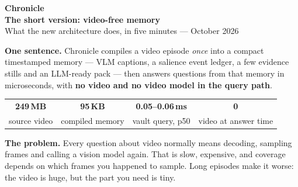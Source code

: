 \documentclass[10pt,a4paper]{article}
\newcommand{\panel}[1]{%
  \noindent\colorbox{panel}{%
    \begin{minipage}{\dimexpr\linewidth-2\fboxsep\relax}
    \vspace{2pt}#1\vspace{2pt}
    \end{minipage}}%
}
\begin{document}
\begin{center}
{\LARGE\bfseries Chronicle}\\[2pt]
{\Large\color{accent}\bfseries The short version: video-free memory}\\[4pt]
{\color{muted}\small What the new architecture does, in five minutes --- October 2026}
\end{center}

\begin{center}
\end{center}

\vspace{1pt}

\panel{
\textbf{One sentence.} Chronicle compiles a video episode \emph{once} into a compact timestamped
memory --- VLM captions, a salience event ledger, a few evidence stills and an LLM-ready pack ---
then answers questions from that memory in microseconds, with \textbf{no video and no video model in
the query path}.
}

\vspace{2pt}

\begin{center}
\begin{tabularx}{\linewidth}{@{}C C C C@{}}
\toprule
{\Large\bfseries\color{accent}249\,MB} & {\Large\bfseries\color{accent}95\,KB} &
{\Large\bfseries\color{accent}0.05--0.06\,ms} & {\Large\bfseries\color{accent}0} \\
{\scriptsize source video} & {\scriptsize compiled memory} & {\scriptsize vault query, p50} &
{\scriptsize video at answer time} \\
\bottomrule
\end{tabularx}
\end{center}

\noindent
\textbf{The problem.} Every question about video normally means decoding, sampling frames and calling
a vision model again. That is slow, expensive, and coverage depends on which frames you happened to
sample. Long episodes make it worse: the video is huge, but the part you need is tiny.
\end{document}
